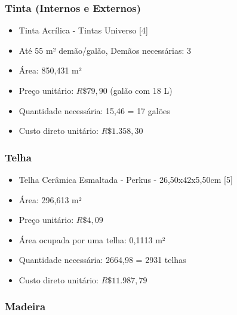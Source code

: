 \subsubsection*{\textbf{Tinta (Internos e Externos)}}


		\begin{itemize}

		\item Tinta Acrílica - Tintas Universo [4]

		\item Até 55 m² demão/galão, Demãos necessárias: 3

		\item Área: 850,431 m²

		\item Preço unitário: $R\$ 79,90$ (galão com 18 L)

		\item Quantidade necessária: 15,46 = 17 galões

		\item Custo direto unitário: $R\$1.358,30$

\end{itemize}

\subsubsection*{\textbf{Telha}}


\begin{itemize}

		\item Telha Cerâmica Esmaltada - Perkus - 26,50x42x5,50cm [5]

		\item Área: 296,613 m²

		\item Preço unitário: $R\$ 4,09$

		\item Área ocupada por uma telha: 0,1113 m²

		\item Quantidade necessária: 2664,98 = 2931 telhas

		\item Custo direto unitário: $R\$11.987,79$

\end{itemize}


\subsubsection*{\textbf{Madeira}}


